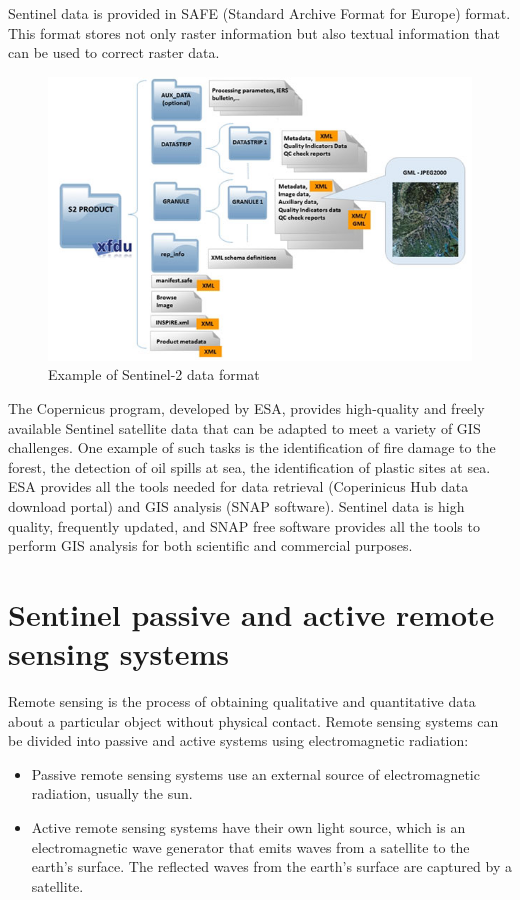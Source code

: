 	Sentinel data is provided in SAFE (Standard Archive Format for Europe) format. This format stores not only raster information but also textual information that can be used to correct raster data.

\begin{figure}[H]
	\centering
	\includegraphics[width=0.8\linewidth]{images/sentinel-2_data_formats.jpg}
	\caption{Example of Sentinel-2 data format}
	\label{fig:sentinel-2_format}
\end{figure}

	The Copernicus program, developed by ESA, provides high-quality and freely available Sentinel satellite data that can be adapted to meet a variety of GIS challenges. One example of such tasks is the identification of fire damage to the forest, the detection of oil spills at sea, the identification of plastic sites at sea. ESA provides all the tools needed for data retrieval (Coperinicus Hub data download portal) and GIS analysis (SNAP software). Sentinel data is high quality, frequently updated, and SNAP free software provides all the tools to perform GIS analysis for both scientific and commercial purposes.

\section{Sentinel passive and active remote sensing systems}
	Remote sensing is the process of obtaining qualitative and quantitative data about a particular object without physical contact.
	Remote sensing systems can be divided into passive and active systems using electromagnetic radiation:
	
	\begin{itemize}
		\item Passive remote sensing systems use an external source of electromagnetic radiation, usually the sun.
		\item Active remote sensing systems have their own light source, which is an electromagnetic wave generator that emits waves from a satellite to the earth's surface. The reflected waves from the earth's surface are captured by a satellite.
	\end{itemize}

